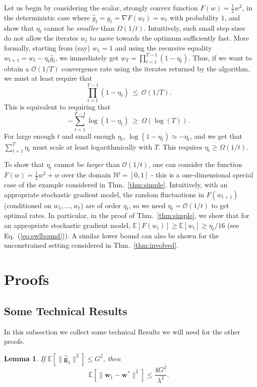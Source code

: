 \documentclass{article}
\newtheorem{lemma}{Lemma}
\newcommand{\E}{\mathbb{E}}
\newcommand{\bw}{\mathbf{w}}
\newcommand{\bg}{\mathbf{g}}
\newcommand{\Ocal}{\mathcal{O}}
\newcommand{\Wcal}{\mathcal{W}}
\newcommand{\norm}[1]{\|#1\|}
\renewcommand{\eqref}[1]{Eq.~(\ref{#1})}
\newcommand{\thmref}[1]{Thm.~\ref{#1}}
\begin{document}
Let us begin by considering the scalar, strongly convex function $F(w)=\frac{1}{2}w^2$, in the deterministic case where $\hat{g}_t = g_t = \nabla F(w_t) = w_t$ with probability $1$, and show that $\eta_t$ cannot be \emph{smaller} than $\Omega(1/t)$. Intuitively, such small step sizes do not allow the iterates $w_t$ to move towards the optimum sufficiently fast. More formally, starting from (say) $w_1=1$ and using the recursive equality $w_{t+1}=w_{t}-\eta_t \hat{g}_t$, we immediately get $w_{T}=\prod_{t=1}^{T-1}(1-\eta_t)$. Thus, if we want to obtain a $\Ocal(1/T)$ convergence rate using the iterates returned by the algorithm, we must at least require that
\[
\prod_{t=1}^{T-1}(1-\eta_t) ~\leq~ \Ocal(1/T).
\]
This is equivalent to requiring that
\[
-\sum_{t=1}^{T-1}\log(1-\eta_t)~\geq~ \Omega(\log(T)).
\]
For large enough $t$ and small enough $\eta_t$, $\log(1-\eta_t)\approx -\eta_t$, and we get that $\sum_{t=1}^{T} \eta_t$ must scale at least logarithmically with $T$. This requires $\eta_t \geq \Omega(1/t)$.

To show that $\eta_t$ cannot be \emph{larger} than $\Ocal(1/t)$, one can consider the function $F(w)=\frac{1}{2}w^2+w$ over the domain $\Wcal=[0,1]$ - this is a one-dimensional special case of the example considered in \thmref{thm:simple}. Intuitively, with an appropriate stochastic gradient model, the random fluctuations in $F(w_{t+1})$ (conditioned on $w_1,\ldots,w_t$) are of order $\eta_t$, so we need $\eta_t=\Ocal(1/t)$ to get optimal rates. In particular, in the proof of \thmref{thm:simple}, we show that for an appropriate stochastic gradient model, $\E[F(w_t)]\geq \E[w_t] \geq \eta_t / 16$ (see \eqref{eq:ewlbound}). A similar lower bound can also be shown for the unconstrained setting considered in \thmref{thm:involved}.

\section{Proofs}\label{app:proofs}

\subsection{Some Technical Results}\label{app:technical}

In this subsection we collect some technical Results we will need for the other proofs.



\begin{lemma}\label{lem:distance}
If $\E[\norm{\hat{\bg}_1}^2]\leq G^2$, then
\[
\E[\norm{\bw_1-\bw^*}^2]\leq  \frac{4G^2}{\lambda^2}.
\]
\end{lemma}
\end{document}
